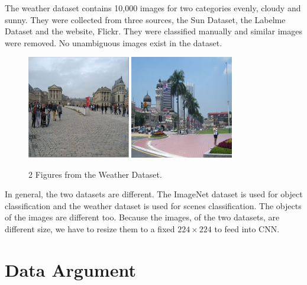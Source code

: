 The weather dataset \citep{lutwo} contains 10,000 images for two categories evenly, cloudy and sunny. They were collected from three sources, the Sun Dataset\citep{russell2008labelme}, the Labelme Dataset\citep{xiao2010sun} and the website, Flickr. They were classified manually and similar images were removed. No unambiguous images exist in the dataset.
\graphicspath{ {./Figures/} }
\begin{figure}[!htb]
    \centering
	\includegraphics[width=0.4\textwidth]{cloudy_0001.png}
    \qquad
    \includegraphics[width=0.4\textwidth]{sunny_0003.png}
    \caption{2 Figures from the Weather Dataset\citep{lutwo}.}%
    \label{fig:WeatherExamples}%
\end{figure}

In general, the two datasets are different. The ImageNet dataset is used for object classification and the weather dataset is used for scenes classification. The objects of the images are different too. Because the images, of the two datasets, are different size, we have to resize them to a fixed $224 \times 224$ to feed into CNN.

\section{Data Argument}

